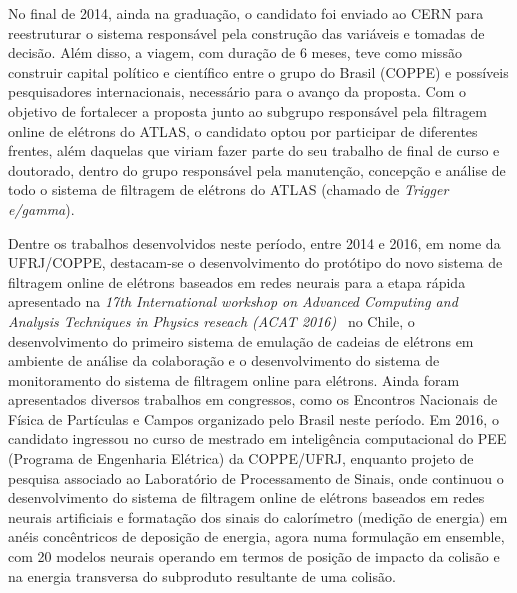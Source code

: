 No final de 2014, ainda na graduação, o candidato foi enviado ao CERN para reestruturar o sistema 
responsável pela construção das variáveis e tomadas de decisão. Além disso, a viagem, com duração 
de 6 meses, teve como missão construir capital político e científico entre o grupo do 
Brasil (COPPE) e possíveis pesquisadores internacionais, necessário para o avanço da 
proposta. Com o objetivo de fortalecer a proposta junto ao subgrupo responsável pela filtragem 
online de elétrons do ATLAS, o candidato optou por participar de diferentes frentes, além 
daquelas que viriam fazer parte do seu trabalho de final de curso e doutorado, dentro do 
grupo responsável pela manutenção, concepção e análise de todo o sistema de filtragem de 
elétrons do ATLAS (chamado de \emph{Trigger e/gamma}).



Dentre os trabalhos desenvolvidos neste período, entre 2014 e 2016, em nome da UFRJ/COPPE, 
destacam-se o desenvolvimento do protótipo do novo sistema de filtragem online de elétrons 
baseados em redes neurais para a etapa rápida apresentado na \emph{17th International workshop on 
Advanced Computing and Analysis Techniques in Physics reseach (ACAT 2016)}~\cite{acat2016} no Chile, o 
desenvolvimento do primeiro sistema de emulação de cadeias de elétrons em ambiente de 
análise da colaboração e o desenvolvimento do sistema de monitoramento do sistema de 
filtragem online para elétrons. Ainda foram apresentados diversos trabalhos em 
congressos, como os Encontros Nacionais de Física de Partículas e Campos 
organizado pelo Brasil neste período.
Em 2016, o candidato ingressou no curso de mestrado em inteligência computacional do 
PEE (Programa de Engenharia Elétrica) da COPPE/UFRJ, enquanto projeto de pesquisa associado 
ao Laboratório de Processamento de Sinais, onde continuou o desenvolvimento do sistema de 
filtragem online de elétrons baseados em redes neurais artificiais e formatação dos sinais 
do calorímetro (medição de energia) em anéis concêntricos de deposição de energia, agora 
numa formulação em ensemble, com 20 modelos neurais operando em termos de posição de impacto 
da colisão e na energia transversa do subproduto resultante de uma colisão.


